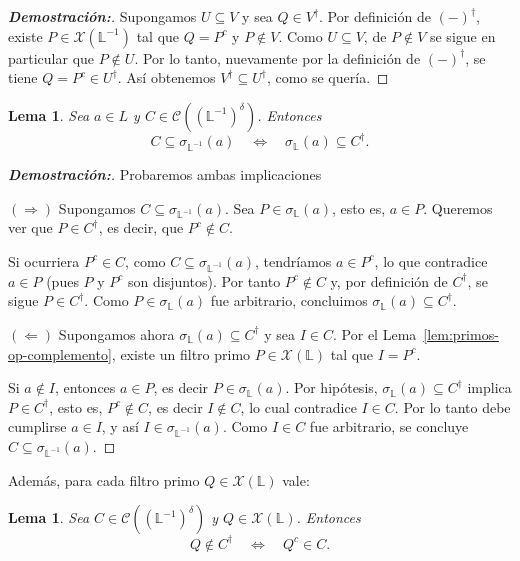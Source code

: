 \documentclass[12pt]{book}
\newtheorem{lemma}[theorem]{Lema}
\begin{document}
\begin{proof}[\textbf{Demostración:}]
Supongamos $U\subseteq V$ y sea $Q\in V^{\dagger}$.  
Por definición de $(-)^{\dagger}$, existe $P\in\mathcal X(\mathbb L^{-1})$
tal que $Q=P^{c}$ y $P\notin V$.
Como $U\subseteq V$, de $P\notin V$ se sigue en particular que 
$P\notin U$.  
Por lo tanto, nuevamente por la definición de $(-)^{\dagger}$, se tiene
$Q=P^{c}\in U^{\dagger}$.
Así obtenemos $V^{\dagger}\subseteq U^{\dagger}$, como se quería.
\end{proof}


\begin{lemma}\label{lem:inclusion-estrella}
Sea $a\in L$ y $C\in\mathcal{C}((\mathbb{L}^{-1})^\delta)$.
Entonces
\[
C\subseteq\sigma_{\mathbb L^{-1}}(a)
\quad\Longleftrightarrow\quad
\sigma_{\mathbb L}(a)\subseteq C^{\dagger}.
\]
\end{lemma}

\begin{proof}[\textbf{Demostración:}] Probaremos ambas implicaciones

\noindent\((\Rightarrow)\) 
Supongamos $C\subseteq\sigma_{\mathbb L^{-1}}(a)$.
Sea $P\in\sigma_{\mathbb L}(a)$, esto es, $a\in P$.
Queremos ver que $P\in C^{\dagger}$, es decir, que $P^{c}\notin C$.

Si ocurriera $P^{c}\in C$, como $C\subseteq\sigma_{\mathbb L^{-1}}(a)$,
tendríamos $a\in P^{c}$, lo que contradice $a\in P$ (pues $P$ y $P^{c}$ son disjuntos).
Por tanto $P^{c}\notin C$ y, por definición de $C^{\dagger}$, se sigue
$P\in C^{\dagger}$. Como $P\in\sigma_{\mathbb L}(a)$ fue arbitrario,
concluimos $\sigma_{\mathbb L}(a)\subseteq C^{\dagger}$.

\medskip
\noindent\((\Leftarrow)\) 
Supongamos ahora $\sigma_{\mathbb L}(a)\subseteq C^{\dagger}$ y sea
$I\in C$.  
Por el Lema~\ref{lem:primos-op-complemento}, existe un filtro primo
$P\in\mathcal X(\mathbb L)$ tal que $I=P^{c}$.

Si $a\notin I$, entonces $a\in P$, es decir $P\in\sigma_{\mathbb L}(a)$.
Por hipótesis, $\sigma_{\mathbb L}(a)\subseteq C^{\dagger}$ implica
$P\in C^{\dagger}$, esto es, $P^{c}\notin C$, es decir $I\notin C$,
lo cual contradice $I\in C$.
Por lo tanto debe cumplirse $a\in I$, y así $I\in\sigma_{\mathbb L^{-1}}(a)$. Como $I\in C$ fue arbitrario, se concluye
$C\subseteq\sigma_{\mathbb L^{-1}}(a)$.
\end{proof}


Además, para cada filtro primo $Q\in\mathcal X(\mathbb L)$ vale:

\begin{lemma}\label{lem:QnotinCstar}
Sea $C\in\mathcal{C}((\mathbb{L}^{-1})^\delta)$ y $Q\in\mathcal X(\mathbb L)$.
Entonces
\[
Q\notin C^{\dagger}
\quad\Longleftrightarrow\quad
Q^{c}\in C.
\]
\end{lemma}
\end{document}
